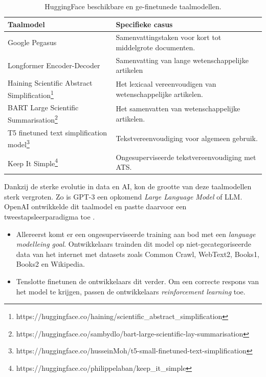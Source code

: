 \begin{center}
	\begin{table}[H]
	\begin{tabular}{ | m{4cm} | m{12cm} | } 
		\hline
		\textbf{Taalmodel} & Specifieke casus \\ \hline
		Google Pegasus & Samenvattingstaken voor kort tot middelgrote documenten. \\
		\hline
		Longformer Encoder-Decoder & Samenvatting van lange wetenschappelijke artikelen \\
		\hline
		Haining Scientific Abstract Simplification\footnote{https://huggingface.co/haining/scientific\_abstract\_simplification} & Het lexicaal vereenvoudigen van wetenschappelijke artikelen. \\
		\hline
		BART Large Scientific Summarisation\footnote{https://huggingface.co/sambydlo/bart-large-scientific-lay-summarisation} & Het samenvatten van wetenschappelijke artikelen. \\
		\hline
		T5 finetuned text simplification model\footnote{https://huggingface.co/husseinMoh/t5-small-finetuned-text-simplification} & Tekstvereenvoudiging voor algemeen gebruik. \\
		\hline
		Keep It Simple\footnote{https://huggingface.co/philippelaban/keep\_it\_simple} & Ongesuperviseerde tekstvereenvoudiging met ATS. \\
		\hline
	\end{tabular}
		\caption{HuggingFace beschikbare en ge-finetunede taalmodellen.}
		\label{table:huggingface-models}
	\end{table}
\end{center}

\medspace

Dankzij de sterke evolutie in data en AI, kon de grootte van deze taalmodellen sterk vergroten. Zo is GPT-3 een opkomend \textit{Large Language Model} of LLM. OpenAI ontwikkelde dit taalmodel en pastte daarvoor een tweestapsleerparadigma toe \autocite{Radford2019, Li2022}. 

\begin{itemize}
	\item Allereerst komt er een ongesuperviseerde training aan bod met een \textit{language modelleing goal}. Ontwikkelaars trainden dit model op niet-gecategoriseerde data van het internet met datasets zoals Common Crawl, WebText2, Books1, Books2 en Wikipedia.
	\item Tenslotte finetunen de ontwikkelaars dit verder. Om een correcte respons van het model te krijgen, passen de ontwikkelaars \textit{reinforcement learning} toe.
\end{itemize}

